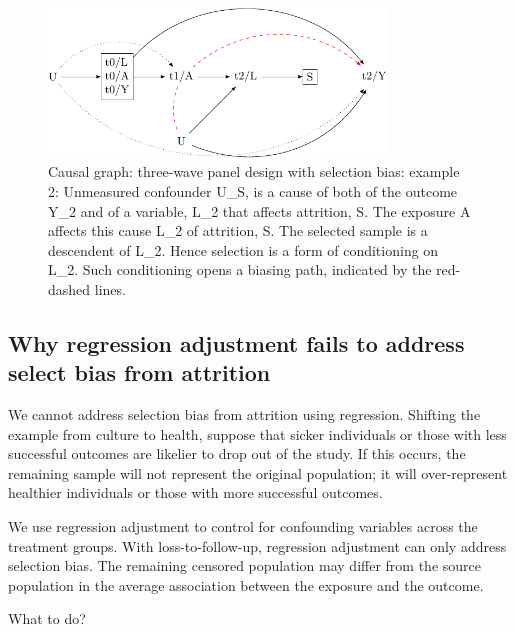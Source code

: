 \documentclass[
  singlecolumn]{report}
\begin{document}
\begin{figure}

{\centering \includegraphics[width=0.8\textwidth,height=\textheight]{causal-dags_files/figure-pdf/fig-dag-8-2-1.pdf}

}

\caption{\label{fig-dag-8-2}Causal graph: three-wave panel design with
selection bias: example 2: Unmeasured confounder U\_S, is a cause of
both of the outcome Y\_2 and of a variable, L\_2 that affects attrition,
S. The exposure A affects this cause L\_2 of attrition, S. The selected
sample is a descendent of L\_2. Hence selection is a form of
conditioning on L\_2. Such conditioning opens a biasing path, indicated
by the red-dashed lines.}

\end{figure}

\hypertarget{why-regression-adjustment-fails-to-address-select-bias-from-attrition}{%
\subsection{Why regression adjustment fails to address select bias from
attrition}\label{why-regression-adjustment-fails-to-address-select-bias-from-attrition}}

We cannot address selection bias from attrition using regression.
Shifting the example from culture to health, suppose that sicker
individuals or those with less successful outcomes are likelier to drop
out of the study. If this occurs, the remaining sample will not
represent the original population; it will over-represent healthier
individuals or those with more successful outcomes.

We use regression adjustment to control for confounding variables across
the treatment groups. With loss-to-follow-up, regression adjustment can
only address selection bias. The remaining censored population may
differ from the source population in the average association between the
exposure and the outcome.

What to do?
\end{document}
